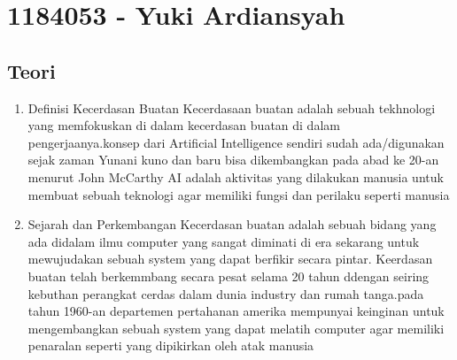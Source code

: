 \section{1184053 - Yuki Ardiansyah}
\subsection{Teori}
\begin{enumerate}

	\item Definisi Kecerdasan Buatan
	\hfill\break
	Kecerdasaan buatan adalah sebuah tekhnologi yang memfokuskan di dalam kecerdasan buatan di dalam pengerjaanya.konsep dari Artificial Intelligence sendiri sudah ada/digunakan sejak zaman Yunani kuno dan baru bisa dikembangkan pada abad ke 20-an menurut John McCarthy AI adalah aktivitas yang dilakukan manusia untuk membuat sebuah teknologi agar memiliki fungsi dan perilaku seperti manusia


	\item Sejarah dan Perkembangan
	\hfill\break
Kecerdasan buatan adalah sebuah bidang yang ada didalam ilmu computer yang sangat diminati di era sekarang untuk mewujudakan sebuah system yang dapat berfikir secara pintar. Keerdasan buatan telah berkemmbang secara pesat selama 20 tahun ddengan seiring kebuthan perangkat cerdas dalam dunia industry dan rumah tanga.pada tahun 1960-an departemen pertahanan amerika mempunyai keinginan untuk mengembangkan sebuah system yang dapat melatih computer agar memiliki penaralan seperti yang dipikirkan oleh atak manusia 
	


\end{enumerate}
